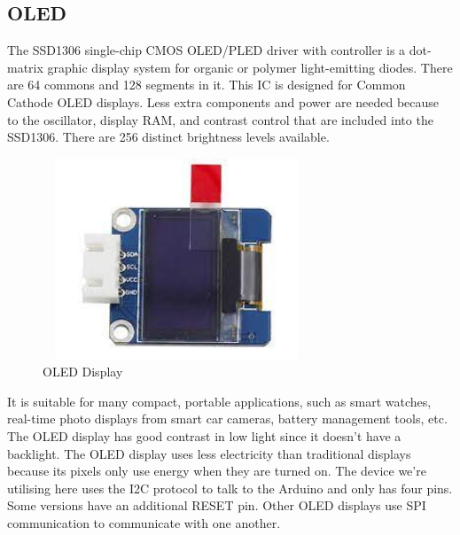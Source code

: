 \documentclass[12pt,a4paper,twocolumn,fleqn]{article}
\begin{document}
\subsection{OLED}
The SSD1306 single-chip CMOS OLED/PLED driver with controller is a dot-matrix graphic display system for organic or polymer light-emitting diodes. There are 64 commons and 128 segments in it. This IC is designed for Common Cathode OLED displays. Less extra components and power are needed because to the oscillator, display RAM, and contrast control that are included into the SSD1306. There are 256 distinct brightness levels available.
\begin{figure} [H]
\includegraphics[width=8cm,height=6cm]{media/oled.jpg}
\centering
\caption{OLED Display}
\end{figure}
It is suitable for many compact, portable applications, such as smart watches, real-time photo displays from smart car cameras, battery management tools, etc. The OLED display has good contrast in low light since it doesn't have a backlight. The OLED display uses less electricity than traditional displays because its pixels only use energy when they are turned on. The device we're utilising here uses the I2C protocol to talk to the Arduino and only has four pins. Some versions have an additional RESET pin. Other OLED displays use SPI communication to communicate with one another.
\end{document}
